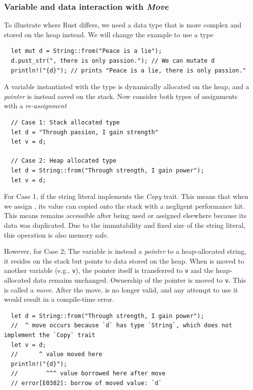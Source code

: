 \documentclass[11pt]{report}
\theoremstyle{definition}
\theoremstyle{plain}
\begin{document}
\subsubsection{Variable and data interaction with \textit{Move}}

To illustrate where Rust differs, we need a data type that is more complex and stored on the heap instead. We will change the example to use a  type
\begin{verbatim}
  let mut d = String::from("Peace is a lie");
  d.pust_str(", there is only passion."); // We can mutate d
  println!("{d}"); // prints "Peace is a lie, there is only passion."
\end{verbatim}
A variable instantiated with the  type is dynamically allocated on the heap, and a \textit{pointer} is instead saved on the stack. Now consider both types of assignments with a \textit{re-assignment}
\begin{verbatim}
  // Case 1: Stack allocated type
  let d = "Through passion, I gain strength"
  let v = d;

  // Case 2: Heap allocated type
  let d = String::from("Through strength, I gain power");
  let v = d;
\end{verbatim}

For Case 1, if the string literal  implements the \textit{Copy} trait. This means that when we assign , its value can copied onto the stack with a negligent performance hit. This means  remains accessible after being used or assigned elsewhere because its data was duplicated. Due to the immutability and fixed size of the string literal, this operation is also memory safe.

However, for Case 2; The variable  is instead a \textit{pointer} to a heap-allocated string, it resides on the stack but points to data stored on the heap. When  is moved to another variable (e.g., \texttt{v}), the pointer itself is transferred to \texttt{v} and the heap-allocated data remains unchanged. Ownership of the pointer is moved to \texttt{v}. This is called a \textit{move}. After the move,  is no longer valid, and any attempt to use it would result in a compile-time error.
\begin{verbatim}
  let d = String::from("Through strength, I gain power");
  //  ^ move occurs because `d` has type `String`, which does not implement the `Copy` trait
  let v = d;
  //      ^ value moved here
  println!("{d}"); 
  //        ^^^ value borrowed here after move
  // error[E0382]: borrow of moved value: `d`
\end{verbatim}
\end{document}
